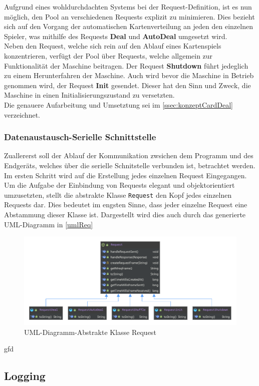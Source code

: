 Aufgrund eines wohldurchdachten Systems bei der Request-Definition, ist es nun möglich, den Pool an verschiedenen Requests explizit zu minimieren.
Dies bezieht sich auf den Vorgang der automatischen Kartenverteilung an jeden den einzelnen Spieler, was mithilfe des Requests \textbf{Deal} und \textbf{AutoDeal} umgesetzt wird.\\
Neben den Request, welche sich rein auf den Ablauf eines Kartenspiels konzentrieren, verfügt der Pool über Requests, welche allgemein zur Funktionalität der Maschine beitragen.
Der Request \textbf{Shutdown} führt jedeglich zu einem Herunterfahren der Maschine.
Auch wird bevor die Maschine in Betrieb genommen wird, der Request \textbf{Init} gesendet.
Dieser hat den Sinn und Zweck, die Maschine in einen Initialisierungszustand zu versetzten.\\
Die genauere Aufarbeitung und Umsetztung sei im \autoref{ssec:konzeptCardDeal} verzeichnet.
\subsubsection{Datenaustausch-Serielle Schnittstelle}
Zuallererst soll der Ablauf der Kommunikation zwsichen dem Programm und des Endgeräts, welches über die serielle Schnitstelle verbunden ist, betrachtet werden.
Im ersten Schritt wird auf die Erstellung jedes einzelnen Request Eingegangen.\\
Um die Aufgabe der Einbindung von Requests elegant und objektorientiert umzusetzten, stellt die abstrakte Klasse \lstinline{Request} den Kopf jedes einzelnen Requests dar.
Dies bedeutet im engsten Sinne, dass jeder einzelne Request eine Abstammung dieser Klasse ist.
Dargestellt wird dies auch durch das generierte UML-Diagramm in \autoref{umlReq}
\begin{figure}[H]
\centering
\includegraphics[width=1\textwidth]{fig/ainf/RequestUML.pdf}
\caption{UML-Diagramm-Abstrakte Klasse Request}
\label{umlReq}
\end{figure}
gfd
\subsection{Logging}
